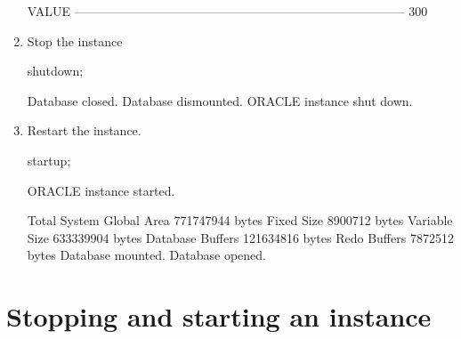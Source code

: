 \documentclass{article}
\begin{document}
\begin{enumerate}
\begin{messageshell}
VALUE
--------------------------------------------------------------------------------
300


\end{messageshell}
\item Stop the instance
\begin{sqlshell}
shutdown;
\end{sqlshell}
\begin{messageshell}
Database closed.
Database dismounted.
ORACLE instance shut down.
\end{messageshell}
\item Restart the instance.
\begin{sqlshell}
startup;
\end{sqlshell}
\begin{messageshell}
ORACLE instance started.

Total System Global Area  771747944 bytes
Fixed Size                  8900712 bytes
Variable Size                633339904 bytes
Database Buffers         121634816 bytes
Redo Buffers                  7872512 bytes
Database mounted.
Database opened.
\end{messageshell}

\end{enumerate}

\section{Stopping and starting an instance}
\end{document}
